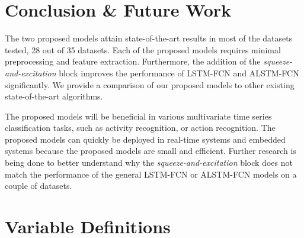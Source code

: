 \documentclass[preprint,12pt,3p]{elsarticle}
\begin{document}
 
\section{Conclusion \& Future Work}
\label{conclusion}
The two proposed models attain state-of-the-art results in most of the datasets tested, 28 out of 35 datasets. Each of the proposed models requires minimal preprocessing and feature extraction. Furthermore, the addition of the \textit{squeeze-and-excitation} block improves the performance of LSTM-FCN and ALSTM-FCN significantly. We provide a comparison of our proposed models to other existing state-of-the-art algorithms. 

The proposed models will be beneficial in various multivariate time series classification tasks, such as activity recognition, or action recognition. The proposed models can quickly be deployed in real-time systems and embedded systems because the proposed models are small and efficient. Further research is being done to better understand why the \textit{squeeze-and-excitation} block does not match the performance of the general LSTM-FCN or ALSTM-FCN models on a couple of datasets. 
 \pagebreak
\appendix
\section{Variable Definitions}

 \newcolumntype{L}{@{}>{\iffalse}l<{\fi}}
\end{document}
